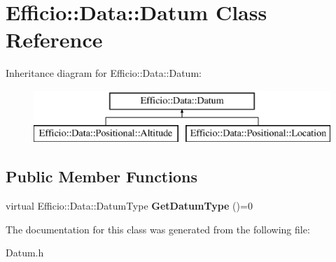 \hypertarget{class_efficio_1_1_data_1_1_datum}{}\section{Efficio\+:\+:Data\+:\+:Datum Class Reference}
\label{class_efficio_1_1_data_1_1_datum}
Inheritance diagram for Efficio\+:\+:Data\+:\+:Datum\+:\begin{figure}[H]
\begin{center}
\leavevmode
\includegraphics[height=2.000000cm]{class_efficio_1_1_data_1_1_datum}
\end{center}
\end{figure}
\subsection*{Public Member Functions}
\begin{DoxyCompactItemize}
\item 
virtual Efficio\+::\+Data\+::\+Datum\+Type {\bfseries Get\+Datum\+Type} ()=0\hypertarget{class_efficio_1_1_data_1_1_datum_a33c5598a2f1f453eb40c31a79a2d0701}{}\label{class_efficio_1_1_data_1_1_datum_a33c5598a2f1f453eb40c31a79a2d0701}

\end{DoxyCompactItemize}


The documentation for this class was generated from the following file\+:\begin{DoxyCompactItemize}
\item 
Datum.\+h\end{DoxyCompactItemize}
